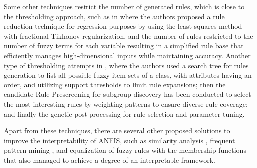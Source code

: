 Some other techniques restrict the number of generated rules, which is close to the thresholding approach, such as in  \cite{tomasiello2022fractional} where the authors proposed a rule reduction technique for regression purposes by using the least-squares method with fractional Tikhonov regularization, and the number of rules restricted to the number of fuzzy terms for each variable resulting in a simplified rule base that efficiently manages high-dimensional inputs while maintaining accuracy.
Another type of thresholding attempts in \cite{alcala2011fuzzy}, where the authors used a search tree for rules generation to list all possible fuzzy item sets of a class, with attributes having an order, and utilizing support thresholds to limit rule expansions; then the candidate Rule Prescreening for subgroup discovery has been conducted to select the most interesting rules by weighting patterns to ensure diverse rule coverage; and finally the genetic post-processing for rule selection and parameter tuning. 

Apart from these techniques, there are several other proposed solutions to improve the interpretability of ANFIS, such as similarity analysis \cite{rajab2019handling}, frequent pattern mining \cite{marimuthu2019oafpm}, and equalization of fuzzy rules with the membership functions\cite{tomasiello2022fractional} that also managed to achieve a degree of an interpretable framework.

